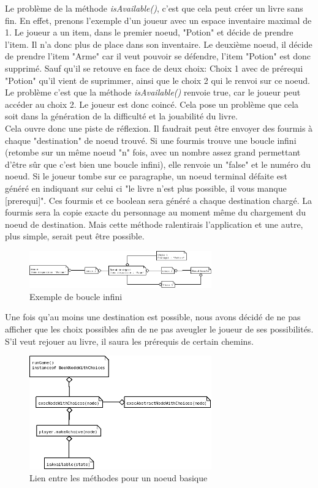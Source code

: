 		Le problème de la méthode \textit{isAvailable()}, c'est que cela peut créer un livre sans fin. En effet, prenons l'exemple d'un joueur avec un espace inventaire maximal de 1. Le joueur a un item, dans le premier noeud, "Potion" et décide de prendre l'item. Il n'a donc plus de place dans son inventaire. Le deuxième noeud, il décide de prendre l'item "Arme" car il veut pouvoir se défendre, l'item "Potion" est donc supprimé. Sauf qu'il se retouve en face de deux choix: Choix 1 avec de prérequi "Potion" qu'il vient de suprimmer, ainsi que le choix 2 qui le renvoi sur ce noeud. Le problème c'est que la méthode \textit{isAvailable()} renvoie true, car le joueur peut accéder au choix 2. Le joueur est donc coincé. Cela pose un problème que cela soit dans la génération de la difficulté et la jouabilité du livre.\\
		Cela ouvre donc une piste de réflexion. Il faudrait peut être envoyer des fourmis à chaque "destination" de noeud trouvé. Si une fourmis trouve une boucle infini (retombe sur un même noeud "n" fois, avec un nombre assez grand permettant d'être sûr que c'est bien une boucle infini), elle renvoie un "false" et le numéro du noeud. Si le joueur tombe sur ce paragraphe, un noeud terminal défaite est généré en indiquant sur celui ci "le livre n'est plus possible, il vous manque [prerequi]". Ces fourmis et ce boolean sera généré a chaque destination chargé. La fourmis sera la copie exacte du personnage au moment même du chargement du noeud de destination. Mais cette méthode ralentirais l'application et une autre, plus simple, serait peut être possible.

		\begin{figure}[H]
			\centering\includegraphics[width=0.70\textwidth]{img/JeuBoucleInfiniExemple.png}
			\caption{Exemple de boucle infini}
		\end{figure}


		Une fois qu'au moins une destination est possible, nous avons décidé de ne pas afficher que les choix possibles afin de ne pas aveugler le joueur de ses possibilités. S'il veut rejouer au livre, il saura les prérequis de certain chemins.

		\begin{figure}[H]
			\centering\includegraphics[width=0.70\textwidth]{img/JeuBookNodeWithChoices.png}
			\caption{Lien entre les méthodes pour un noeud basique}
			\label{fig:JeuBookNodeWithChoices}
		\end{figure}


